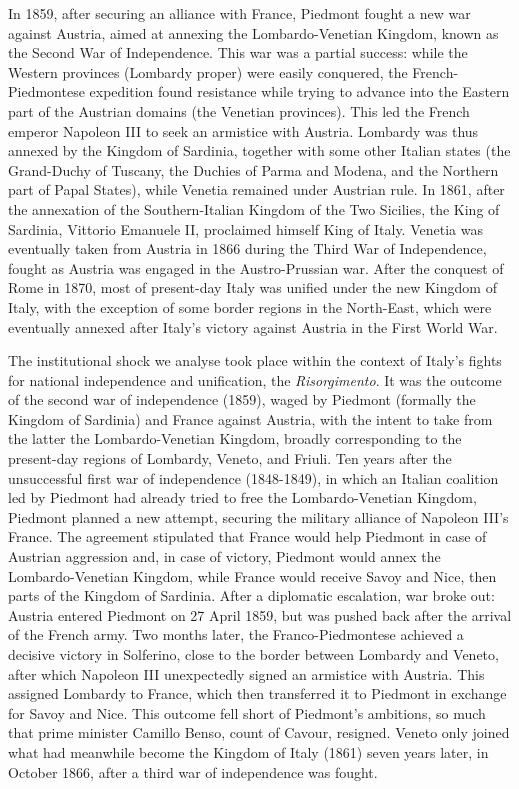 In 1859, after securing an alliance with France, Piedmont fought a new war against Austria, aimed at annexing the Lombardo-Venetian Kingdom, known as the Second War of Independence. This war was a partial success: while the Western provinces (Lombardy proper) were easily conquered, the French-Piedmontese expedition found resistance while trying to advance into the Eastern part of the Austrian domains (the Venetian provinces). This led the French emperor Napoleon III to seek an armistice with Austria. Lombardy was thus annexed by the Kingdom of Sardinia, together with some other Italian states (the Grand-Duchy of Tuscany, the Duchies of Parma and Modena, and the Northern part of Papal States), while Venetia remained under Austrian rule. In 1861, after the annexation of the Southern-Italian Kingdom of the Two Sicilies, the King of Sardinia, Vittorio Emanuele II, proclaimed himself King of Italy. Venetia was eventually taken from Austria in 1866 during the Third War of Independence, fought as Austria was engaged in the Austro-Prussian war. After the conquest of Rome in 1870, most of present-day Italy was unified under the new Kingdom of Italy, with the exception of some border regions in the North-East, which were eventually annexed after Italy's victory against Austria in the First World War.

The institutional shock we analyse took place within the context of Italy's fights for national independence and unification, the \textit{Risorgimento}. It was the outcome of the second war of independence (1859), waged by Piedmont (formally the Kingdom of Sardinia) and France against Austria, with the intent to take from the latter the Lombardo-Venetian Kingdom, broadly corresponding to the present-day regions of Lombardy, Veneto, and Friuli. Ten years after the unsuccessful first war of independence (1848-1849), in which an Italian coalition led by Piedmont had already tried to free the Lombardo-Venetian Kingdom, %
Piedmont planned a new attempt, securing the military alliance of Napoleon III's France. The agreement stipulated that France would help Piedmont in case of Austrian aggression and, in case of victory, Piedmont would annex the Lombardo-Venetian Kingdom, while France would receive Savoy and Nice, then parts of the Kingdom of Sardinia. After a diplomatic escalation, war broke out: Austria entered Piedmont on 27 April 1859, but was pushed back after the arrival of the French army. Two months later, the Franco-Piedmontese achieved a decisive victory in Solferino, close to the border between Lombardy and Veneto, after which Napoleon III unexpectedly signed an armistice with Austria. This assigned Lombardy to France, which then transferred it to Piedmont in exchange for Savoy and Nice. This outcome fell short of Piedmont's ambitions, so much that prime minister Camillo Benso, count of Cavour, resigned. Veneto only joined what had meanwhile become the Kingdom of Italy (1861) seven years later, in October 1866, after a third war of independence was fought.

